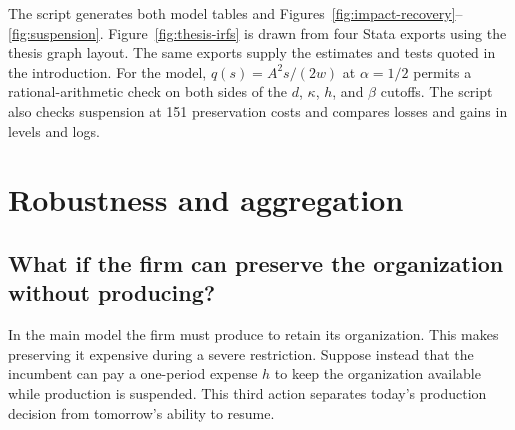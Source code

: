 \documentclass[11pt,letterpaper]{article}
\begin{document}
The script generates both model tables and Figures~\ref{fig:impact-recovery}--\ref{fig:suspension}. Figure~\ref{fig:thesis-irfs} is drawn from four Stata exports using the thesis graph layout. The same exports supply the estimates and tests quoted in the introduction. For the model, $q(s)=A^2s/(2w)$ at $\alpha=1/2$ permits a rational-arithmetic check on both sides of the $d$, $\kappa$, $h$, and $\beta$ cutoffs. The script also checks suspension at 151 preservation costs and compares losses and gains in levels and logs.

\section{Robustness and aggregation}
\subsection*{What if the firm can preserve the organization without producing?}
In the main model the firm must produce to retain its organization. This makes preserving it expensive during a severe restriction. Suppose instead that the incumbent can pay a one-period expense $h$ to keep the organization available while production is suspended. This third action separates today's production decision from tomorrow's ability to resume.
\end{document}
